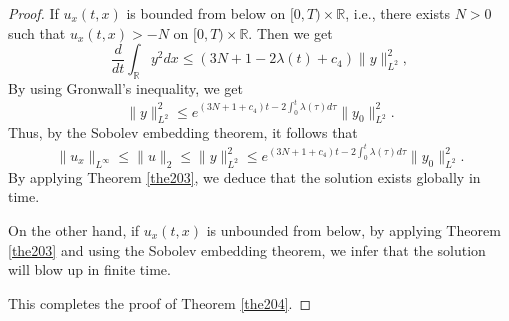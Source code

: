 \documentclass[preprint,12pt]{elsarticle}
\numberwithin{equation}{section}
\begin{document}
\begin{proof}
If $u_{x}(t,x)$ is bounded from below on $[0,T)\times \mathbb{R}$, i.e., there exists $N>0$ such that $u_{x}(t,x)>-N$ on $[0,T)\times \mathbb{R}$. Then we get
\begin{equation*}
\frac{d}{dt}\int_{\mathbb{R}}y^{2}dx\leq\left(3N+1-2\lambda(t)+c_{4}\right)\|y\|_{L^{2}}^{2},
\end{equation*}
By using Gronwall's inequality, we get
\begin{equation*}
\|y\|_{L^{2}}^{2}\leq e^{(3N+1+c_{4})t-2\int_{0}^{t}\lambda(\tau)d\tau}\|y_{0}\|_{L^{2}}^{2}.
\end{equation*}
Thus, by the Sobolev embedding theorem, it follows that
\begin{equation*}
\|u_{x}\|_{L^{\infty}}\leq \|u\|_{2}\leq \|y\|_{L^{2}}^{2}\leq e^{(3N+1+c_{4})t-2\int_{0}^{t}\lambda(\tau)d\tau}\|y_{0}\|_{L^{2}}^{2}.
\end{equation*}
By applying Theorem \ref{the203}, we deduce that the solution exists globally in time.

On the other hand, if $u_{x}(t,x)$ is unbounded from below, by applying Theorem \ref{the203} and using the Sobolev embedding theorem, we infer that the solution will blow up in finite time.

This completes the proof of Theorem \ref{the204}.
\end{proof}
\end{document}
